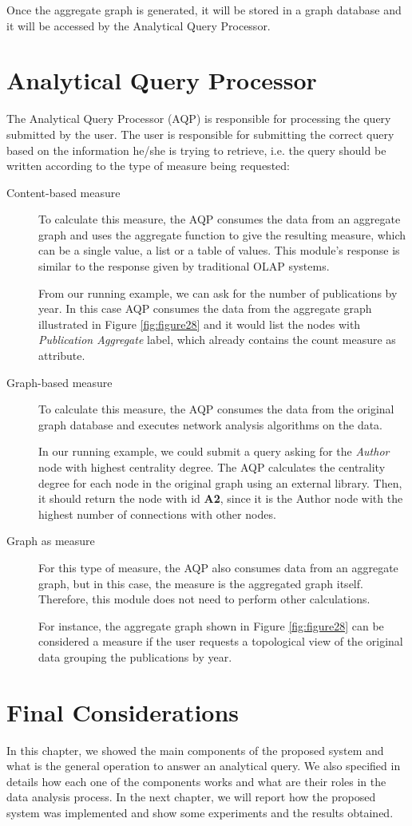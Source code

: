 Once the aggregate graph is generated, it will be stored in a graph database and it will be accessed by the Analytical Query Processor.

\section{Analytical Query Processor}

The Analytical Query Processor (AQP) is responsible for processing the query submitted by the user. The user is responsible for submitting the correct query based on the information he/she is trying to retrieve, i.e. the query should be written according to the type of measure being requested:
\begin{description}
\item[Content-based measure] To calculate this measure, the AQP consumes the data from an aggregate graph and uses the aggregate function to give the resulting measure, which can be a single value, a list or a table of values. This module's response is similar to the response given by traditional OLAP systems.

From our running example, we can ask for the number of publications by year. In this case AQP consumes the data from the aggregate graph illustrated in Figure \ref{fig:figure28} and it would list the nodes with \emph{Publication Aggregate} label, which already contains the count measure as attribute.

\item[Graph-based measure] To calculate this measure, the AQP consumes the data from the original graph database and executes network analysis algorithms on the data. 

In our running example, we could submit a query asking for the \emph{Author} node with highest centrality degree. The AQP calculates the centrality degree for each node in the original graph using an external library. Then, it should return the node with id \textbf{A2}, since it is the Author node with the highest number of connections with other nodes.

\item[Graph as measure] For this type of measure, the AQP also consumes data from an aggregate graph, but in this case, the measure is the aggregated graph itself. Therefore, this module does not need to perform other calculations.

For instance, the aggregate graph shown in Figure \ref{fig:figure28} can be considered a measure if the user requests a topological view of the original data grouping the publications by year.
\end{description}

\section{Final Considerations}
In this chapter, we showed the main components of the proposed system and what is the general operation to answer an analytical query. We also specified in details how each one of the components works and what are their roles in the data analysis process. In the next chapter, we will report how the proposed system was implemented and show some experiments and the results obtained.
